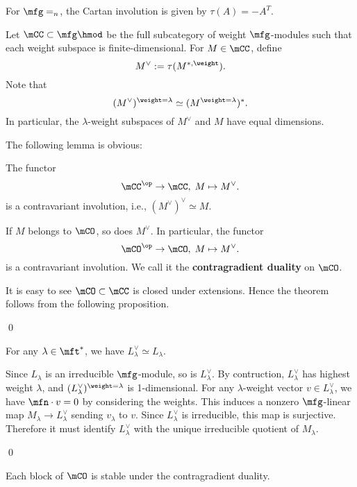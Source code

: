 	\begin{exam}
		For $\mfg=\sl_n$, the Cartan involution is given by $\tau(A)=-A^T$.
	\end{exam}

	\begin{constr}
		Let $\mCC\subset \mfg\hmod$ be the full subcategory of weight $\mfg$-modules such that each weight subspace is finite-dimensional. For $M\in \mCC$, define
		\[
			M^\vee := \tau( M^{*,\weight} ).
		\]
		Note that
		\[
			(M^\vee)^{\weight = \lambda} \simeq (M^{\weight = \lambda})^*.
		\]
		In particular, the $\lambda$-weight subspaces of $M^\vee$ and $M$ have equal dimensions.
	\end{constr}

	The following lemma is obvious:

	\begin{lem}
		The functor
		\[
			\mCC^\op \to \mCC,\; M\mapsto M^\vee.
		\]
		is a contravariant involution, i.e., $(M^\vee)^\vee \simeq M$.
	\end{lem}

	\begin{thm}
		If $M$ belongs to $\mCO$, so does $M^\vee$. In particular, the functor
		\[
			\mCO^\op \to \mCO,\; M\mapsto M^\vee.
		\]
		is a contravariant involution. We call it the \textbf{contragradient duality} on $\mCO$.
	\end{thm}

	\proof
		It is easy to see $\mCO\subset \mCC$ is closed under extensions. Hence the theorem follows from the following proposition.

	\qed

	\begin{prop}
		For any $\lambda\in \mft^*$, we have $L_\lambda^\vee \simeq L_\lambda$.
	\end{prop}

	\proof
		Since $L_\lambda$ is an irreducible $\mfg$-module, so is $L_\lambda^\vee$. By contruction, $L_\lambda^\vee$ has highest weight $\lambda$, and $(L_\lambda^\vee)^{\weight=\lambda}$ is 1-dimensional. For any $\lambda$-weight vector $v\in L_\lambda^\vee$, we have $\mfn \cdot v = 0$ by considering the weights. This induces a nonzero $\mfg$-linear map $M_\lambda \to L_\lambda^\vee$ sending $v_\lambda$ to $v$. Since $L_\lambda^\vee$ is irreducible, this map is surjective. Therefore it must identify $ L_\lambda^\vee$ with the unique irreducible quotient of $M_\lambda$.

	\qed

	\begin{cor}
		Each block of $\mCO$ is stable under the contragradient duality.
	\end{cor}

